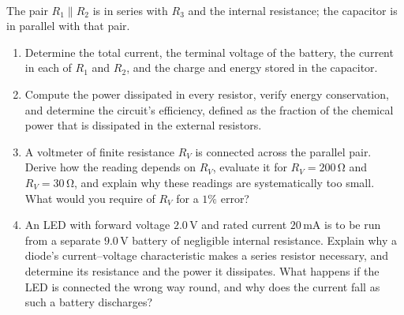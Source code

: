 \documentclass[11pt,a4paper]{article}
\newcommand{\unit}[1]{\,\mathrm{#1}}
\newenvironment{parts}{\begin{enumerate}[label=\textbf{\alph*)}]}{\end{enumerate}}
\begin{document}
\begin{center}
\\[1pt]
{\small The pair $R_1\parallel R_2$ is in series with $R_3$ and the internal
resistance; the capacitor is in parallel with that pair.}
\end{center}

\begin{parts}
\item Determine the total current, the terminal voltage of the battery, the
      current in each of $R_1$ and $R_2$, and the charge and energy stored in
      the capacitor.
\item Compute the power dissipated in every resistor, verify energy
      conservation, and determine the circuit's efficiency, defined as the
      fraction of the chemical power that is dissipated in the external
      resistors.
\item A voltmeter of finite resistance $R_V$ is connected across the parallel
      pair. Derive how the reading depends on $R_V$, evaluate it for
      $R_V=200\unit{\Omega}$ and $R_V=30\unit{\Omega}$, and explain why these
      readings are systematically too small. What would you require of $R_V$
      for a $1\%$ error?
\item An LED with forward voltage $2.0\unit{V}$ and rated current
      $20\unit{mA}$ is to be run from a separate $9.0\unit{V}$ battery of
      negligible internal resistance. Explain why a diode's
      current--voltage characteristic makes a series resistor necessary, and
      determine its resistance and the power it dissipates. What happens if
      the LED is connected the wrong way round, and why does the current fall
      as such a battery discharges?
\end{parts}
\end{document}
